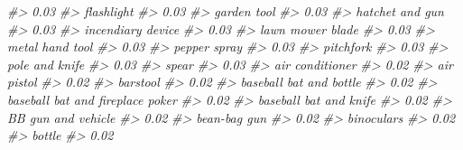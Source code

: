 \documentclass[
  12pt,
  openany]{book}
\newenvironment{Shaded}{\begin{snugshade}}{\end{snugshade}}
\newcommand{\CommentTok}[1]{\textcolor[rgb]{0.37,0.37,0.37}{\textit{#1}}}
\begin{document}
\begin{Shaded}
\begin{Highlighting}[]
\CommentTok{\#\textgreater{}                             0.03 }
\CommentTok{\#\textgreater{}                       flashlight }
\CommentTok{\#\textgreater{}                             0.03 }
\CommentTok{\#\textgreater{}                      garden tool }
\CommentTok{\#\textgreater{}                             0.03 }
\CommentTok{\#\textgreater{}                  hatchet and gun }
\CommentTok{\#\textgreater{}                             0.03 }
\CommentTok{\#\textgreater{}                incendiary device }
\CommentTok{\#\textgreater{}                             0.03 }
\CommentTok{\#\textgreater{}                 lawn mower blade }
\CommentTok{\#\textgreater{}                             0.03 }
\CommentTok{\#\textgreater{}                  metal hand tool }
\CommentTok{\#\textgreater{}                             0.03 }
\CommentTok{\#\textgreater{}                     pepper spray }
\CommentTok{\#\textgreater{}                             0.03 }
\CommentTok{\#\textgreater{}                        pitchfork }
\CommentTok{\#\textgreater{}                             0.03 }
\CommentTok{\#\textgreater{}                   pole and knife }
\CommentTok{\#\textgreater{}                             0.03 }
\CommentTok{\#\textgreater{}                            spear }
\CommentTok{\#\textgreater{}                             0.03 }
\CommentTok{\#\textgreater{}                  air conditioner }
\CommentTok{\#\textgreater{}                             0.02 }
\CommentTok{\#\textgreater{}                       air pistol }
\CommentTok{\#\textgreater{}                             0.02 }
\CommentTok{\#\textgreater{}                         barstool }
\CommentTok{\#\textgreater{}                             0.02 }
\CommentTok{\#\textgreater{}          baseball bat and bottle }
\CommentTok{\#\textgreater{}                             0.02 }
\CommentTok{\#\textgreater{} baseball bat and fireplace poker }
\CommentTok{\#\textgreater{}                             0.02 }
\CommentTok{\#\textgreater{}           baseball bat and knife }
\CommentTok{\#\textgreater{}                             0.02 }
\CommentTok{\#\textgreater{}               BB gun and vehicle }
\CommentTok{\#\textgreater{}                             0.02 }
\CommentTok{\#\textgreater{}                     bean{-}bag gun }
\CommentTok{\#\textgreater{}                             0.02 }
\CommentTok{\#\textgreater{}                       binoculars }
\CommentTok{\#\textgreater{}                             0.02 }
\CommentTok{\#\textgreater{}                           bottle }
\CommentTok{\#\textgreater{}                             0.02 }

\end{Highlighting}
\end{Shaded}
\end{document}
